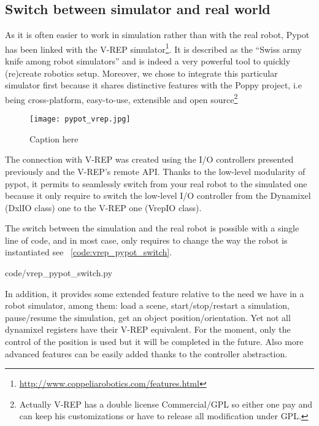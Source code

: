 \subsection{Switch between simulator and real world} %

As it is often easier to work in simulation rather than with the real robot, Pypot has been linked with the V-REP simulator\footnote{\url{http://www.coppeliarobotics.com/features.html}}. It is described as the “Swiss army knife among robot simulators” and is indeed a very powerful tool to quickly (re)create robotics setup. Moreover, we chose to integrate this particular simulator first because it shares distinctive features with the Poppy project, i.e being cross-platform, easy-to-use, extensible and open source\footnote{Actually V-REP has a double license Commercial/GPL so either one pay and can keep his customizations or have to release all modification under GPL.}

\begin{figure}[tb]
    \begin{center}
        \texttt{[image: pypot\_vrep.jpg]}
    \end{center}
    \caption{Caption here}
    \label{fig:pypot-vrep}
\end{figure}


The connection with V-REP was created using the I/O controllers presented previously and the V-REP’s remote API.
Thanks to the low-level modularity of pypot, it permits to seamlessly switch from your real robot to the simulated one because it only require to switch the low-level I/O controller from the Dynamixel (DxlIO class) one to the V-REP one (VrepIO class).

The switch between the simulation and the real robot is possible with a single line of code, and in most case, only requires to change the way the robot is instantiated see \codename~\ref{code:vrep_pypot_switch}.


    {code/vrep_pypot_switch.py}

In addition, it provides some extended feature relative to the need we have in a robot simulator, among them:
load a scene, start/stop/restart a simulation, pause/resume the simulation, get an object position/orientation.
Yet not all dynamixel registers have their V-REP equivalent. For the moment, only the control of the position is used but it will be completed in the future. Also more advanced features can be easily added thanks to the controller abstraction.

